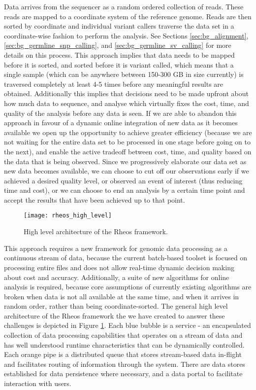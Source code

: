 Data arrives from the sequencer as a random ordered collection of reads. These reads are mapped to a coordinate system of the reference genome. Reads are then sorted by coordinate and individual variant callers traverse the data set in a coordinate-wise fashion to perform the analysis. See Sections \ref{sec:bg_alignment}, \ref{sec:bg_germline_snp_calling}, and \ref{sec:bg_germline_sv_calling} for more details on this process. This approach implies that data needs to be mapped before it is sorted, and sorted before it is variant called, which means that a single sample (which can be anywhere between 150-300 GB in size currently) is traversed completely at least 4-5 times before any meaningful results are obtained. Additionally this implies that decisions need to be made upfront about how much data to sequence, and analyse which virtually fixes the cost, time, and quality of the analysis before any data is seen. If we are able to abandon this approach in favour of a dynamic online integration of new data as it becomes available we open up the opportunity to achieve greater efficiency (because we are not waiting for the entire data set to be processed in one stage before going on to the next), and enable the active tradeoff between cost, time, and quality based on the data that is being observed. Since we progressively elaborate our data set as new data becomes available, we can choose to cut off our observations early if we achieved a desired quality level, or observed an event of interest (thus reducing time and cost), or we can choose to end an analysis by a certain time point and accept the results that have been achieved up to that point. 

\begin{figure}[H]
\texttt{[image: rheos\_high\_level]}
\centering
\caption {High level architecture of the Rheos framework.}
\label{fig:rheos_high_level}
\end{figure}

This approach requires a new framework for genomic data processing as a continuous stream of data, because the current batch-based toolset is focused on processing entire files and does not allow real-time dynamic decision making about cost and accuracy. Additionally, a suite of new algorithms for online analysis is required, because core assumptions of currently existing algorithms are broken when data is not all available at the same time, and when it arrives in random order, rather than being coordinate-sorted. The general high level architecture of the Rheos framework the we have created to answer these challenges is depicted in Figure \ref{fig:rheos_high_level}. Each blue bubble is a service - an encapsulated collection of data processing capabilities that operates on a stream of data and has well understood runtime characteristics that can be dynamically controlled. Each orange pipe is a distributed queue that stores stream-based data in-flight and facilitates routing of information through the system. There are data stores established for data persistence where necessary, and a data portal to facilitate interaction with users.

